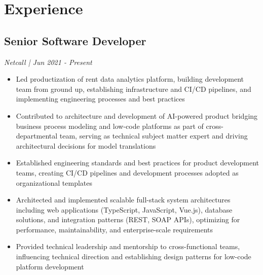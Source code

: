 %
%
\section{Experience}
\vspace{6pt}
%
%
\subsection{Senior Software Developer}
\textit{ Netcall | Jun 2021 - Present }
\begin{itemize}
	\item Led productization of rent data analytics platform, building development team from ground up, establishing infrastructure and CI/CD pipelines, and implementing engineering processes and best practices
	\item Contributed to architecture and development of AI-powered product bridging business process modeling and low-code platforms as part of cross-departmental team, serving as technical subject matter expert and driving architectural decisions for model translations
	\item Established engineering standards and best practices for product development teams, creating CI/CD pipelines and development processes adopted as organizational templates
	\item Architected and implemented scalable full-stack system architectures including web applications (TypeScript, JavaScript, Vue.js), database solutions, and integration patterns (REST, SOAP APIs), optimizing for performance, maintainability, and enterprise-scale requirements
	\item Provided technical leadership and mentorship to cross-functional teams, influencing technical direction and establishing design patterns for low-code platform development
\end{itemize}
\vspace{6pt}

%
%
